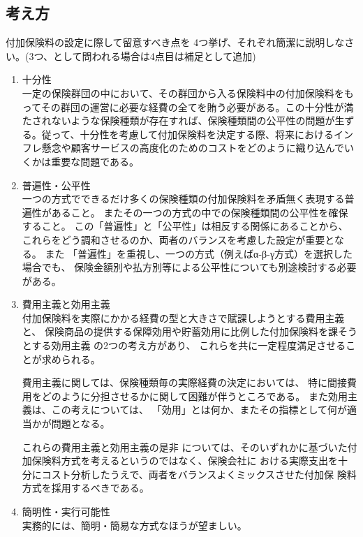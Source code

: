 \documentclass[report,gutter=10mm,fore-edge=10mm,uplatex,dvipdfmx]{jlreq}
\begin{document}
\subsection{考え方}


付加保険料の設定に際して留意すべき点を 4つ挙げ、それぞれ簡潔に説明しなさい。(3つ、として問われる場合は4点目は補足として追加)

\begin{enumerate}
\tightlist
\item
  十分性\\
  一定の保険群団の中において、その群団から入る保険料中の付加保険料をもってその群団の運営に必要な経費の全てを賄う必要がある。この十分性が満たされないような保険種類が存在すれば、保険種類間の公平性の問題が生ずる。従って、十分性を考慮して付加保険料を決定する際、将来におけるインフレ懸念や顧客サービスの高度化のためのコストをどのように織り込んでいくかは重要な問題である。
\item
  普遍性・公平性\\

    一つの方式でできるだけ多くの保険種類の付加保険料を矛盾無く表現する普遍性があること。
   またその一つの方式の中での保険種類間の公平性を確保すること。
   この「普遍性」と「公平性」は相反する関係にあることから、
   これらをどう調和させるのか、両者のバランスを考慮した設定が重要となる。
   また 「普遍性」を重視し、一つの方式（例えばα-β-γ方式）を選択した場合でも、
        保険金額別や払方別等による公平性についても別途検討する必要がある。

\item
  費用主義と効用主義\\

    付加保険料を実際にかかる経費の型と大きさで賦課しようとする費用主義と、
    保険商品の提供する保障効用や貯蓄効用に比例した付加保険料を課そうとする効用主義
     の2つの考え方があり、
     これらを共に一定程度満足させることが求められる。

     費用主義に関しては、保険種類毎の実際経費の決定においては、
      特に間接費用をどのように分担させるかに関して困難が伴うところである。
     また効用主義は、この考えについては、
     「効用」とは何か、またその指標として何が適当かが問題となる。

これらの費用主義と効用主義の是非
については、そのいずれかに基づいた付加保険料方式を考えるというのではなく、保険会社に
おける実際支出を十分にコスト分析したうえで、両者をバランスよくミックスさせた付加保
険料方式を採用するべきである。

\item
  簡明性・実行可能性\\

     実務的には、簡明・簡易な方式なほうが望ましい。

\end{enumerate}
\end{document}
